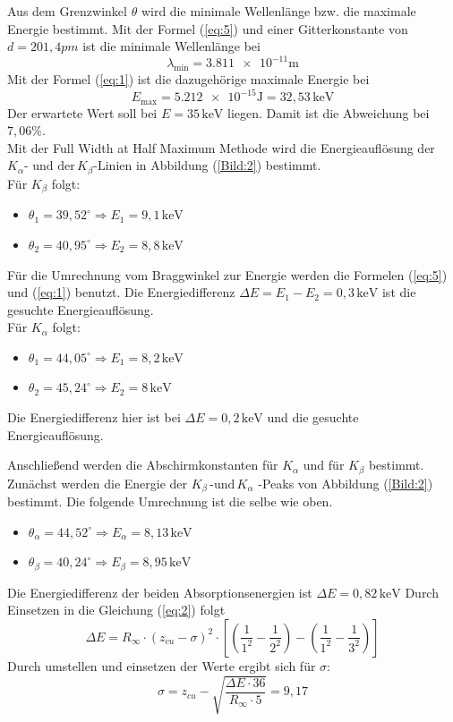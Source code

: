 Aus dem Grenzwinkel $\theta$ wird die minimale Wellenlänge bzw. die maximale Energie bestimmt.
Mit der Formel (\ref{eq:5}) und einer Gitterkonstante von $d=201,4 pm$  ist die minimale Wellenlänge bei
\begin{equation*}
  \lambda_{\text{min}} = \num{3.811e-11} \text{m}
\end{equation*}
Mit der Formel (\ref{eq:1}) ist die dazugehörige maximale Energie bei
\begin{equation*}
  E_{\text{max}} = \num{5.212e-15} \text{J} = 32,53 \, \text{keV}
\end{equation*}
Der erwartete Wert soll bei $E = 35 \,\text{keV}$ liegen.
Damit ist die Abweichung bei $7,06 \%$.\\

Mit der Full Width at Half Maximum Methode wird die Energieauflösung der $K_\alpha \text{- und der} \, K_\beta \text{-Linien}$ in Abbildung (\ref{Bild:2}) bestimmt.\\
Für $K_\beta$ folgt:
\begin{itemize}
  \item $\theta_1 = 39,52^\circ \Rightarrow E_1 = 9,1 \, \text{keV}$
  \item $\theta_2 = 40,95^\circ \Rightarrow E_2 = 8,8 \, \text{keV}$
\end{itemize}
Für die Umrechnung vom Braggwinkel zur Energie werden die Formelen (\ref{eq:5}) und (\ref{eq:1}) benutzt.
Die Energiedifferenz $\Delta E = E_1 - E_2 = 0,3 \, \text{keV}$ ist die gesuchte Energieauflösung.\\

Für $K_\alpha$ folgt:
\begin{itemize}
  \item $\theta_1 = 44,05^\circ \Rightarrow E_1 = 8,2 \, \text{keV}$
  \item $\theta_2 = 45,24^\circ \Rightarrow E_2 = 8 \, \text{keV}$
\end{itemize}
Die Energiedifferenz hier ist bei $\Delta E = 0,2 \,\text{keV}$ und die gesuchte Energieauflösung.

Anschließend werden die Abschirmkonstanten für $K_\alpha$ und für $K_\beta$ bestimmt.
Zunächst werden die Energie der $K_\beta \, \text{-und}\, K_\alpha$ -Peaks von Abbildung (\ref{Bild:2}) bestimmt.
Die folgende Umrechnung ist die selbe wie oben.
\begin{itemize}
  \item $\theta_\alpha = 44,52^\circ \Rightarrow E_\alpha = 8,13 \,\text{keV}$
  \item $\theta_\beta = 40,24^\circ \Rightarrow E_\beta = 8,95 \,\text{keV}$
\end{itemize}
Die Energiedifferenz der beiden Absorptionsenergien ist $\Delta E = 0,82 \, \text{keV}$
Durch Einsetzen in die Gleichung (\ref{eq:2}) folgt
\begin{equation*}
  \Delta E = R_\infty \cdot (z_{cu} - \sigma)^2 \cdot [(\frac{1}{1^2}-\frac{1}{2^2})-(\frac{1}{1^2}-\frac{1}{3^2})]
\end{equation*}
Durch umstellen und einsetzen der Werte ergibt sich für $\sigma$:
\begin{equation*}
  \sigma = z_{cu} - \sqrt{\frac{\Delta E \cdot 36}{R_\infty \cdot 5}} = 9,17
\end{equation*}

